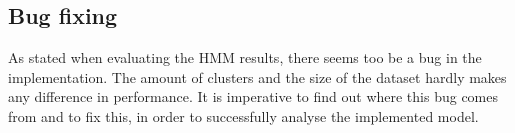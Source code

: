 \subsection{Bug fixing}
As stated when evaluating the HMM results, there seems too be a bug in the implementation. The amount of clusters and the size of the dataset hardly makes any difference in performance. It is imperative to find out where this bug comes from and to fix this, in order to successfully analyse the implemented model.


